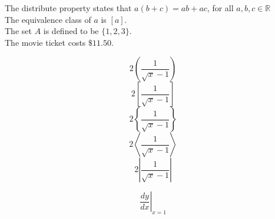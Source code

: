 \documentclass[11pt]{article}
\begin{document}
The distribute property states that $a(b+c) = ab+ac$, for all $a, b, c \in \mathbb{R}$ \\[6pt]
The equivalence class of $a$ is $[a]$.\\[6pt]
The set $A$ is defined to be $\{1, 2, 3\}$.\\[6pt]
The movie ticket costs $\$11.50$. 

$$2\left(\frac{1}{\sqrt{x}-1}\right)$$
$$2\left[\frac{1}{\sqrt{x}-1}\right]$$
$$2\left\{\frac{1}{\sqrt{x}-1}\right\}$$
$$2\left\langle\frac{1}{\sqrt{x}-1}\right\rangle$$
$$2\left|\frac{1}{\sqrt{x}-1}\right|$$

$$\left.\frac{dy}{dx}\right|_{x=1}$$
\end{document}
